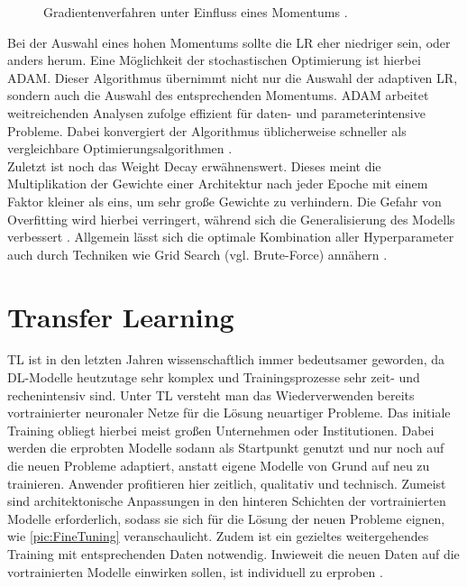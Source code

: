 \begin{figure}[h!]
  \centering
  \caption{Gradientenverfahren unter Einfluss eines Momentums \cite{CSNOJ}.}
  \label{pic:MomentumUpdate}
\end{figure}

\noindent
Bei der Auswahl eines hohen Momentums sollte die \ac{LR} eher niedriger sein, oder anders herum. Eine Möglichkeit der stochastischen Optimierung ist hierbei \ac{ADAM}. Dieser Algorithmus übernimmt nicht nur die Auswahl der adaptiven \ac{LR}, sondern auch die Auswahl des entsprechenden Momentums. \ac{ADAM} arbeitet weitreichenden Analysen zufolge effizient für daten- und parameterintensive Probleme. Dabei konvergiert der Algorithmus üblicherweise schneller als vergleichbare Optimierungsalgorithmen \cite[S.~1-2]{KIN17}.\\

\noindent
Zuletzt ist noch das Weight Decay erwähnenswert. Dieses meint die Multiplikation der Gewichte einer Architektur nach jeder Epoche mit einem Faktor kleiner als eins, um sehr große Gewichte zu verhindern. Die Gefahr von Overfitting wird hierbei verringert, während sich die Generalisierung des Modells verbessert \cite[S.~154]{ZHA20}. Allgemein lässt sich die optimale Kombination aller Hyperparameter auch durch Techniken wie Grid Search (vgl. Brute-Force) annähern \cite[S.~24]{YAN20}.


\section{Transfer Learning}
\noindent
\ac{TL} ist in den letzten Jahren wissenschaftlich immer bedeutsamer geworden, da \ac{DL}-Modelle heutzutage sehr komplex und Trainingsprozesse sehr zeit- und rechenintensiv sind. Unter \ac{TL} versteht man das Wiederverwenden bereits vortrainierter neuronaler Netze für die Lösung neuartiger Probleme. Das initiale Training obliegt hierbei meist großen Unternehmen oder Institutionen. Dabei werden die erprobten Modelle sodann als Startpunkt genutzt und nur noch auf die neuen Probleme adaptiert, anstatt eigene Modelle von Grund auf neu zu trainieren. Anwender profitieren hier zeitlich, qualitativ und technisch. Zumeist sind architektonische Anpassungen in den hinteren Schichten der vortrainierten Modelle erforderlich, sodass sie sich für die Lösung der neuen Probleme eignen, wie \autoref{pic:FineTuning} veranschaulicht. Zudem ist ein gezieltes weitergehendes Training mit entsprechenden Daten notwendig. Inwieweit die neuen Daten auf die vortrainierten Modelle einwirken sollen, ist individuell zu erproben \cite[S.~554]{ZHA20}.\\

